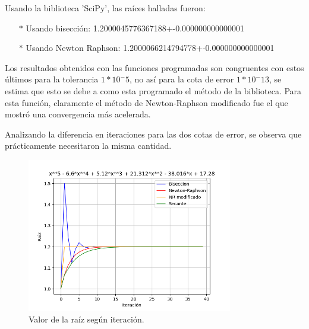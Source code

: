 \documentclass[titlepage,a4paper]{article}
\begin{document}
Usando la biblioteca 'SciPy', las raíces halladas fueron:
\begin{itemize}
    \item[$*$]Usando bisección:   1.2000045776367188+-0.000000000000001
    \item[$*$]Usando Newton Raphson:  1.2000066214794778+-0.000000000000001
\end{itemize}

Los resultados obtenidos con las funciones programadas son congruentes con estos últimos para la tolerancia $1*10^-5$, no así para la cota de error $1*10^-13$, se estima que esto se debe a como esta programado el método de la biblioteca. Para esta función, claramente el método de Newton-Raphson modificado fue el que mostró una convergencia más acelerada. 

Analizando la diferencia en iteraciones para las dos cotas de error, se observa que prácticamente necesitaron la misma cantidad.
\begin{figure}[H]
\centering
\includegraphics[width=0.8\textwidth]{raiz f2.png}
\caption{\label{fig:class01}Valor de la raíz según iteración.}
\end{figure}
\end{document}
